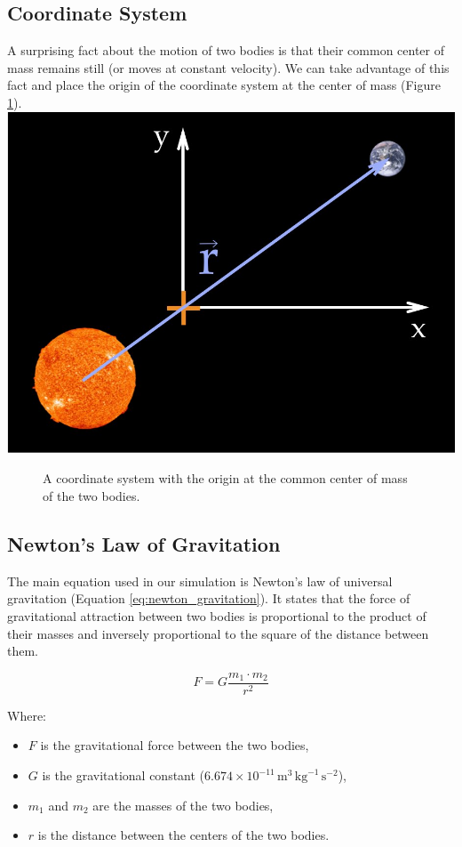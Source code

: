 \documentclass{article}
\begin{document}
\subsection*{Coordinate System}

A surprising fact about the motion of two bodies is that their common center of mass remains still (or moves at constant velocity). We can take advantage of this fact and place the origin of the coordinate system at the center of mass (Figure \ref{fig:coordinate_system}).
  \includegraphics[width=0.5\linewidth]{0010_coordinate_system.jpg}
\begin{figure}
       \caption
        {A coordinate system with the origin at the common center of mass of the two bodies.}
        
        
        
    \label{fig:coordinate_system}
\end{figure}

\subsection*{Newton's Law of Gravitation}

The main equation used in our simulation is Newton’s law of universal gravitation (Equation \ref{eq:newton_gravitation}). It states that the force of gravitational attraction between two bodies is proportional to the product of their masses and inversely proportional to the square of the distance between them.

\begin{equation}
    F = G \frac{{m_1 \cdot m_2}}{{r^2}}
    \label{eq:newton_gravitation}
\end{equation}

Where:
\begin{itemize}
    \item $F$ is the gravitational force between the two bodies,
    \item $G$ is the gravitational constant ($6.674 \times 10^{-11} \, \text{m}^3 \, \text{kg}^{-1} \, \text{s}^{-2}$),
    \item $m_1$ and $m_2$ are the masses of the two bodies,
    \item $r$ is the distance between the centers of the two bodies.
\end{itemize}
\end{document}
